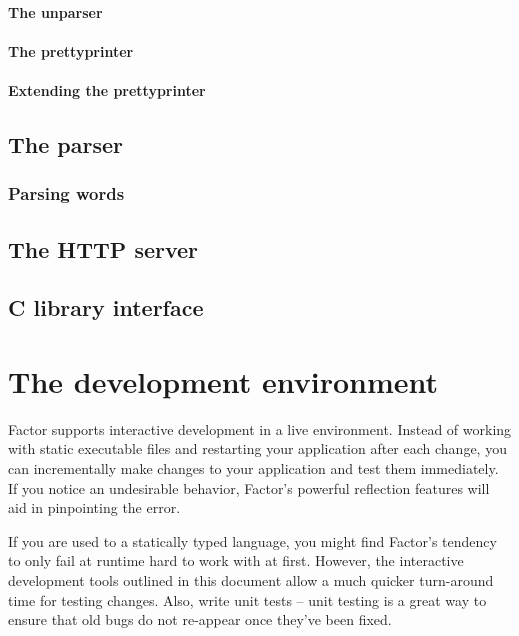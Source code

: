 \documentclass{report}
\begin{document}
\subsubsection{The unparser}

\subsubsection{The prettyprinter}

\subsubsection{Extending the prettyprinter}

\section{The parser}

\subsection{\label{parsing-words}Parsing words}

\section{The HTTP server}

\section{C library interface}

\chapter{The development environment}

Factor supports interactive development in a live environment. Instead of working with
static executable files and restarting your application after each change, you can
incrementally make changes to your application and test them immediately. If you
notice an undesirable behavior, Factor's powerful reflection features will aid in
pinpointing the error.

If you are used to a statically typed language, you might find Factor's tendency to only fail at runtime hard to work with at first. However, the interactive development tools outlined in this document allow a much quicker turn-around time for testing changes. Also, write unit tests -- unit testing is a great way to ensure that old bugs do not re-appear once they've been fixed.
\end{document}
